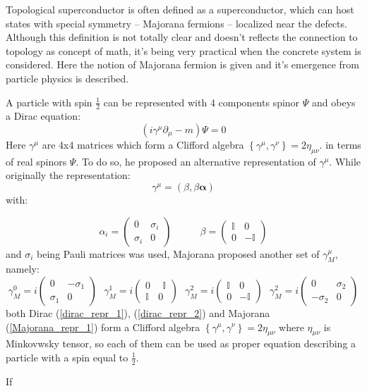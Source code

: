 Topological superconductor is often defined as a
superconductor, which can host states with special symmetry -- Majorana fermions -- localized near the defects. Although this definition is not totally clear and doesn't reflects the connection to topology as concept of math, it's being very practical when the concrete system is considered. Here the notion of Majorana fermion is given and it's emergence from particle physics is described.

A particle with spin $ \frac{1}{2} $ can be represented with 4 components spinor $ \Psi $ and obeys a Dirac equation:
\begin{equation}
	\left(
		i\gamma^\mu\partial_\mu - m 
	\right)
	\Psi
	=
	0
\end{equation}
Here $ \gamma^\mu $ are 4x4 matrices which form a Clifford algebra $ \left\{\gamma^\mu,\gamma^\nu \right\} = 2\eta_{\mu\nu} $.
in terms of real spinors $ \Psi $. To do so, he proposed an alternative representation of $ \gamma^\mu $. While originally the representation:
\begin{equation}
\label{dirac_repr_1}
	\gamma^\mu
	=
	\left(
		\beta, \beta \pmb{\alpha}
	\right)
\end{equation}
with:

\begin{equation}
\label{dirac_repr_2}
	\alpha_i 
	=
	\begin{pmatrix}
	 0 & \sigma_i \\
	 \sigma_i & 0
	\end{pmatrix}
	~~~~~~~~~~~~~
	\beta 
	=
	\begin{pmatrix}
	\mathbb{I} & 0 \\
	0      &  -\mathbb{I}
	\end{pmatrix}
\end{equation}
and $ \sigma_i $ being Pauli matrices was used, Majorana proposed another set of $ \gamma^\mu_M $, namely:
\begin{equation}
\label{Majorana_repr_1}
	\gamma^0_M
	=
	i
	\begin{pmatrix}
	0 & -\sigma_1 \\
	\sigma_1 & 0
	\end{pmatrix}
	~~~
	\gamma^1_M
	=
	i
	\begin{pmatrix}
	0 & ~~\mathbb{I} \\
	\mathbb{I} & 0
	\end{pmatrix}
	~~~
	\gamma^2_M
	=
	i
	\begin{pmatrix}
	\mathbb{I} & 0 \\
	0          & -\mathbb{I}
	\end{pmatrix}
	~~~
	\gamma^2_M
	=
	i
	\begin{pmatrix}
	0 & \sigma_2 \\
	-\sigma_2 & 0
	\end{pmatrix}	
\end{equation}
both Dirac (\ref{dirac_repr_1}), (\ref{dirac_repr_2}) and Majorana (\ref{Majorana_repr_1}) form a Clifford algebra $ \left\{\gamma^\mu,\gamma^\nu \right\} = 2\eta_{\mu\nu} $ where $ \eta_{\mu\nu} $
 is Minkovwsky tensor, so each of them can be used as proper equation describing a particle with a spin equal to $ \frac{1}{2} $.
 
 If 
 \fi
